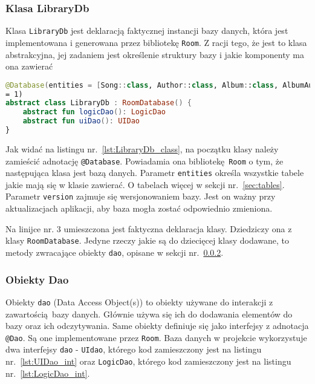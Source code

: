 \subsubsection{Klasa LibraryDb} \label{sec:LibraryDb}

Klasa \texttt{LibraryDb} jest deklaracją faktycznej instancji bazy danych, która jest implementowana i generowana przez bibliotekę \texttt{Room}. Z racji tego, że jest to klasa abstrakcyjna, jej zadaniem jest określenie struktury bazy i jakie komponenty ma ona zawierać

\begin{lstlisting}[caption=Deklaracja bazy LibraryDb, label={lst:LibraryDb_class}, language=kotlin]
@Database(entities = [Song::class, Author::class, Album::class, AlbumAuthorCrossRef::class], version
= 1)
abstract class LibraryDb : RoomDatabase() {
    abstract fun logicDao(): LogicDao
    abstract fun uiDao(): UIDao
}

\end{lstlisting}

Jak widać na listingu nr.~\ref{lst:LibraryDb_class}, na początku klasy należy zamieścić adnotację \texttt{@Database}. Powiadamia ona bibliotekę \texttt{Room} o tym, że następująca klasa jest bazą danych. Parametr \texttt{entities} określa wszystkie tabele jakie mają się w klasie zawierać. O tabelach więcej w sekcji nr.~\ref{sec:tables}. Parametr \texttt{version} zajmuje się wersjonowaniem bazy. Jest on ważny przy aktualizacjach aplikacji, aby baza mogła zostać odpowiednio zmieniona. 

Na linijce nr. 3 umieszczona jest faktyczna deklaracja klasy. Dziedziczy ona z klasy \texttt{RoomDatabase}. Jedyne rzeczy jakie są do dziecięcej klasy dodawane, to metody zwracające obiekty \texttt{dao}, opisane w sekcji nr.~\ref{sec:daos}.

\subsubsection{Obiekty Dao} \label{sec:daos}

Obiekty \texttt{dao} (Data Access Object(s)) to obiekty używane do interakcji z zawartością bazy danych. Głównie używa się ich do dodawania elementów do bazy oraz ich odczytywania. Same obiekty definiuje się jako interfejsy z adnotacja \texttt{@Dao}. Są one implementowane przez \texttt{Room}. Baza danych w projekcie wykorzystuje dwa interfejsy \texttt{dao} - \texttt{UIdao}, którego kod zamieszczony jest na listingu nr.~\ref{lst:UIDao_int} oraz \texttt{LogicDao}, którego kod zamieszczony jest na listingu nr.~\ref{lst:LogicDao_int}.

